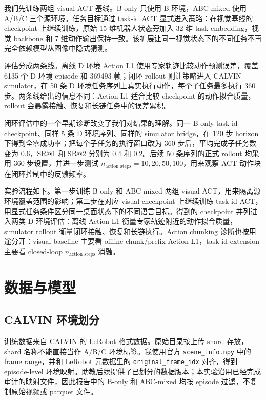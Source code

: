 \documentclass[11pt,a4paper,fontset=fandol]{ctexart}
\newcommand{\methodname}{task-id ACT}
\newcommand{\visualact}{visual ACT}
\newcommand{\actionlone}{Action L1}
\begin{document}
我们先训练两组 \visualact{} 基线。B-only 只使用 B 环境，ABC-mixed 使用 A/B/C 三个源环境。任务目标通过 \methodname{} 显式进入策略：在视觉基线的 checkpoint 上继续训练，原始 15 维机器人状态旁加入 32 维 task embedding，视觉 backbone 和 7 维动作输出保持一致。该扩展让同一视觉状态下的不同任务不再完全依赖模型从图像中隐式猜测。

评估分成两条线。离线 D 环境 \actionlone{} 使用专家轨迹比较动作预测误差，覆盖 6135 个 D 环境 episode 和 369493 帧；闭环 rollout 则让策略进入 CALVIN simulator，在 50 条 D 环境任务序列上真实执行动作，每个子任务最多执行 360 步。两条线给出的信息不同：\actionlone{} 适合比较 checkpoint 的动作拟合质量，rollout 会暴露接触、恢复和长链任务中的误差累积。

闭环评估中的一个早期诊断改变了我们对结果的理解。同一 B-only task-id checkpoint、同样 5 条 D 环境序列、同样的 simulator bridge，在 120 步 horizon 下得到全零成功率；把每个子任务的执行窗口改为 360 步后，平均完成子任务数变为 0.6，SR@1 和 SR@2 分别为 0.4 和 0.2。后续 50 条序列的正式 rollout 均采用 360 步设置，并进一步测试 $n_\text{action steps}=10,20,50,100$，用来观察 ACT 动作块在闭环控制中的反馈频率。

实验流程如下。第一步训练 B-only 和 ABC-mixed 两组 visual ACT，用来隔离源环境覆盖范围的影响；第二步在对应 visual checkpoint 上继续训练 task-id ACT，用显式任务条件区分同一桌面状态下的不同语言目标。得到的 checkpoint 并列进入两类 D 环境评估：离线 \actionlone{} 衡量专家轨迹附近的动作拟合质量，simulator rollout 衡量闭环接触、恢复和长链执行。Action chunking 诊断也按用途分开：visual baseline 主要看 offline chunk/prefix \actionlone{}，task-id extension 主要看 closed-loop $n_\text{action steps}$ 消融。

\section{数据与模型}

\subsection{CALVIN 环境划分}

训练数据来自 CALVIN 的 LeRobot 格式数据。原始目录按上传 shard 存放，shard 名称不能直接当作 A/B/C 环境标签。我使用官方 \texttt{scene\_info.npy} 中的 frame range，并和 LeRobot 元数据里的 \texttt{original\_frame\_idx} 对齐，得到 episode-level 环境映射。助教后续提供了已划分的数据版本；本实验沿用已经完成审计的映射文件，因此报告中的 B-only 和 ABC-mixed 均按 episode 过滤，不复制原始视频或 parquet 文件。
\end{document}
